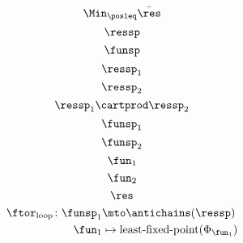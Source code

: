 {\begin{forslides}
\begin{equation}
            \label{eq:opt_6}
            \Min_{\posleq}\bar{\res}
        \end{equation}
        \begin{equation}
            \label{eq:genfun_1}
            \ressp
        \end{equation}
        \begin{equation}
            \label{eq:genfun_2}
            \funsp
        \end{equation}
        \begin{equation}
            \label{eq:genfun_3}
            \ressp_1
        \end{equation}
        \begin{equation}
            \label{eq:genfun_3_1}
            \ressp_2
        \end{equation}
        \begin{equation}
            \label{eq:genfun_3_2}
            \ressp_1\cartprod \ressp_2
        \end{equation}
        \begin{equation}
            \label{eq:genfun_4}
            \funsp_1
        \end{equation}
        \begin{equation}
            \label{eq:genfun_5}
            \funsp_2
        \end{equation}
        \begin{equation}
            \label{eq:genfun_6}
            \fun_1
        \end{equation}
        \begin{equation}
            \label{eq:genfun_7}
            \fun_2
        \end{equation}
        \begin{equation}
            \label{eq:genfun_8}
            \res
        \end{equation}
        \begin{equation}
            \label{eq:genfun_9}
            \begin{aligned}
                \ftor_\mathrm{loop}\colon \funsp_1 & \mto \antichains(\ressp) \\
                \fun_1                             & \mapsto \text{least-fixed-point}(\Phi_{\fun_1})
            \end{aligned}
        \end{equation}
        \begin{equation}
            \label{eq:genfun_10}
            \begin{aligned}

\end{aligned}
\end{equation}
\end{forslides}}

